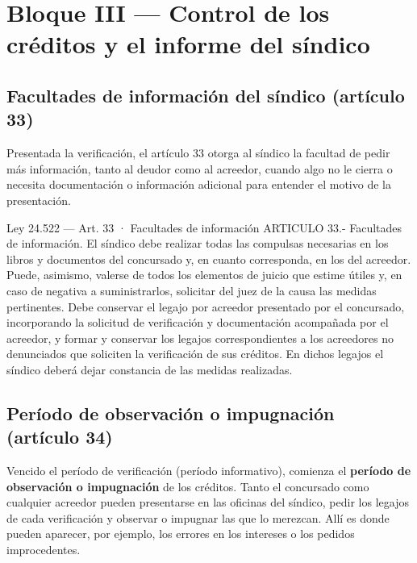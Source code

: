 \documentclass[12pt,oneside]{book}
\begin{document}
\chapter[Control de los créditos e informe del síndico]{Bloque III — Control de los créditos y el informe del síndico}

\section{Facultades de información del síndico (artículo 33)}

Presentada la verificación, el artículo 33 otorga al síndico la facultad de pedir más información, tanto al deudor como al acreedor, cuando algo no le cierra o necesita documentación o información adicional para entender el motivo de la presentación.

\begin{legal}{Ley 24.522 — Art. 33 · Facultades de información}
ARTICULO 33.- Facultades de información. El síndico debe realizar todas las compulsas necesarias en los libros y documentos del concursado y, en cuanto corresponda, en los del acreedor. Puede, asimismo, valerse de todos los elementos de juicio que estime útiles y, en caso de negativa a suministrarlos, solicitar del juez de la causa las medidas pertinentes. Debe conservar el legajo por acreedor presentado por el concursado, incorporando la solicitud de verificación y documentación acompañada por el acreedor, y formar y conservar los legajos correspondientes a los acreedores no denunciados que soliciten la verificación de sus créditos. En dichos legajos el síndico deberá dejar constancia de las medidas realizadas.
\end{legal}

\section{Período de observación o impugnación (artículo 34)}

Vencido el período de verificación (período informativo), comienza el \textbf{período de observación o impugnación} de los créditos. Tanto el concursado como cualquier acreedor pueden presentarse en las oficinas del síndico, pedir los legajos de cada verificación y observar o impugnar las que lo merezcan. Allí es donde pueden aparecer, por ejemplo, los errores en los intereses o los pedidos improcedentes.
\end{document}
